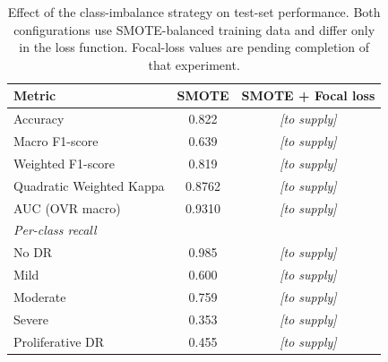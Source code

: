 \begin{table}[H]
\centering
\caption{Effect of the class-imbalance strategy on test-set performance. Both
configurations use SMOTE-balanced training data and differ only in the loss
function. Focal-loss values are pending completion of that experiment.}
\label{tab:imbalance_ablation}
\begin{tabular}{lcc}
\toprule
Metric & SMOTE & SMOTE + Focal loss \\
\midrule
Accuracy                  & 0.822  & \textit{[to supply]} \\
Macro F1-score            & 0.639  & \textit{[to supply]} \\
Weighted F1-score         & 0.819  & \textit{[to supply]} \\
Quadratic Weighted Kappa  & 0.8762 & \textit{[to supply]} \\
AUC (OVR macro)           & 0.9310 & \textit{[to supply]} \\
\midrule
\multicolumn{3}{l}{\emph{Per-class recall}} \\
\quad No DR            & 0.985 & \textit{[to supply]} \\
\quad Mild             & 0.600 & \textit{[to supply]} \\
\quad Moderate         & 0.759 & \textit{[to supply]} \\
\quad Severe           & 0.353 & \textit{[to supply]} \\
\quad Proliferative DR & 0.455 & \textit{[to supply]} \\
\bottomrule
\end{tabular}
\end{table}

